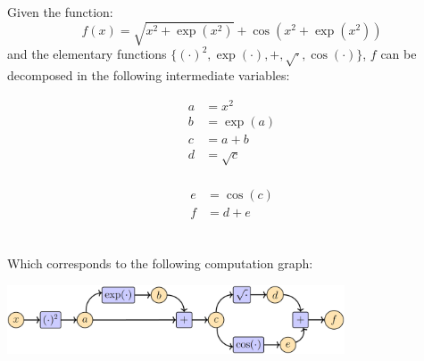 \begin{example}
    Given the function:
    \[ f(x) = \sqrt{x^2 + \exp(x^2)} + \cos(x^2 + \exp(x^2)) \]
    and the elementary functions $\{ (\cdot)^2, \exp(\cdot), +, \sqrt{\cdot}, \cos(\cdot) \}$,
    $f$ can be decomposed in the following intermediate variables:\\
    \begin{minipage}{.5\linewidth}
        \[
            \begin{split}
                a &= x^2        \\
                b &= \exp(a)    \\
                c &= a + b      \\
                d &= \sqrt{c}   \\
            \end{split} 
        \]
    \end{minipage}%
    \begin{minipage}{.5\linewidth}
        \[
            \begin{split}
                e &= \cos(c)    \\
                f &= d + e      \\
            \end{split} 
        \]
    \end{minipage}\\

    Which corresponds to the following computation graph:
    \begin{center}
        \includegraphics[width=0.75\textwidth]{img/auto_diff.png}
    \end{center}


\end{example}
